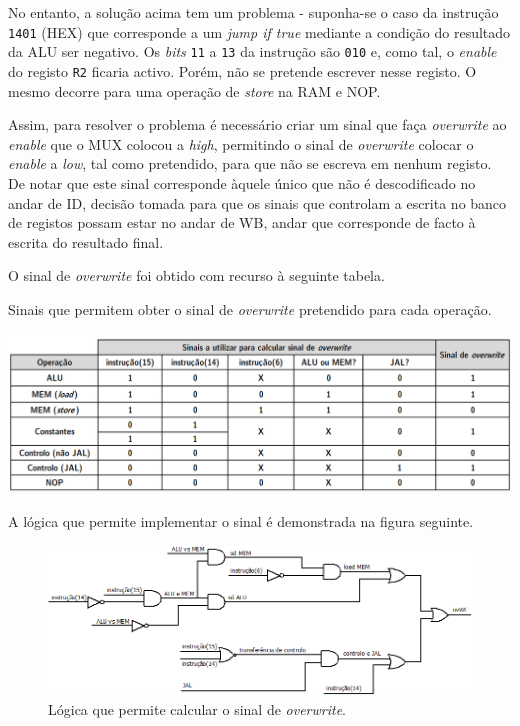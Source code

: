 \documentclass[11pt]{article}
\numberwithin{equation}{section}
\begin{document}
No entanto, a solução acima tem um problema - suponha-se o caso da instrução \texttt{1401} (HEX) que corresponde a um \textit{jump if true} mediante a condição do resultado da ALU ser negativo. Os \textit{bits} \texttt{11} a \texttt{13} da instrução são \texttt{010} e, como tal, o \textit{enable} do registo \texttt{R2} ficaria activo. Porém, não se pretende escrever nesse registo. O mesmo decorre para uma operação de \textit{store} na RAM e NOP. 

Assim, para resolver o problema é necessário criar um sinal que faça \textit{overwrite} ao \textit{enable} que o MUX colocou a \textit{high}, permitindo o sinal de \textit{overwrite} colocar o \textit{enable} a \textit{low}, tal como pretendido, para que não se escreva em nenhum registo. De notar que este sinal corresponde àquele único que não é descodificado no andar de ID, decisão tomada para que os sinais que controlam a escrita no banco de registos possam estar no andar de WB, andar que corresponde de facto à escrita do resultado final.

O sinal de \textit{overwrite} foi obtido com recurso à seguinte tabela.

\vspace{1.5mm}
\begin{table}[h]
	\centering
	\caption{Sinais que permitem obter o sinal de \textit{overwrite} pretendido para cada operação.}
	\vspace{-2mm}
 	\includegraphics[keepaspectratio=true, scale=0.40]{tabelas/tabelaWE}
\end{table}

A lógica que permite implementar o sinal é demonstrada na figura seguinte.

\begin{figure}[h]
	\centering
	\includegraphics[keepaspectratio=true, scale=0.35]{imagens/WB3}
	\caption{Lógica que permite calcular o sinal de \textit{overwrite}.}
	\vspace{-0.8em}
\end{figure}
\end{document}
